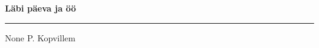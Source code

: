 \documentclass[10pt]{book}
\begin{document}
{
  \samepage
  \raggedbottom
  \raggedright
  \sloppy


  \vspace{0.2in}

  \noindent\begin{minipage}{.1\textwidth}
    \hfill\vspace{0.1in}
  \end{minipage}%
  \noindent\begin{minipage}{.8\textwidth}
    \centering
    \bfseries
    \large L\"abi p\"aeva ja \"o\"o
  \end{minipage}%
  \noindent\begin{minipage}{.1\textwidth}
      \hfill\vspace{0.1in}
  \end{minipage}

  \nopagebreak[4]
  \vspace{0.1in}
  \nopagebreak[4]
  \hrule height 0.05ex
  \nopagebreak[4]
  \vspace{-0.05in}

  {\footnotesize None \hfill P. Kopvillem }\\
  \vspace{0.01in}



}
\end{document}
